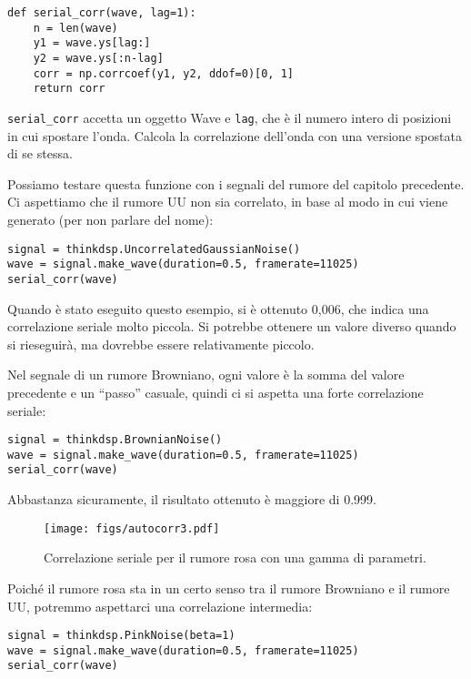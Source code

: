 \documentclass[12pt,a4paper]{book}
\begin{document}
\begin{verbatim} 
def serial_corr(wave, lag=1):
    n = len(wave)
    y1 = wave.ys[lag:]
    y2 = wave.ys[:n-lag]
    corr = np.corrcoef(y1, y2, ddof=0)[0, 1]
    return corr
 \end{verbatim} 

\verb"serial_corr" accetta un oggetto Wave e {\tt lag}, che è il numero intero di posizioni in cui spostare l'onda. Calcola la correlazione dell'onda con una versione spostata di se stessa.

Possiamo testare questa funzione con i segnali del rumore del capitolo precedente. Ci aspettiamo che il rumore UU non sia correlato, in base al modo in cui viene generato (per non parlare del nome):

\begin{verbatim} 
signal = thinkdsp.UncorrelatedGaussianNoise()
wave = signal.make_wave(duration=0.5, framerate=11025)
serial_corr(wave)
 \end{verbatim} 

Quando è stato eseguito questo esempio, si è ottenuto 0,006, che indica una correlazione seriale molto piccola. Si potrebbe ottenere un valore diverso quando si rieseguirà, ma dovrebbe essere relativamente piccolo.

Nel segnale di un rumore Browniano, ogni valore è la somma del valore precedente e un ``passo'' casuale, quindi ci si aspetta una forte correlazione seriale:

\begin{verbatim} 
signal = thinkdsp.BrownianNoise()
wave = signal.make_wave(duration=0.5, framerate=11025)
serial_corr(wave)
 \end{verbatim} 

Abbastanza sicuramente, il risultato ottenuto è maggiore di 0.999.

\begin{figure} 

\centerline{\texttt{[image: figs/autocorr3.pdf]}} \caption{Correlazione seriale per il rumore rosa con una gamma di parametri.} \label{fig.autocorr3} \end{figure} 

Poiché il rumore rosa sta in un certo senso tra il rumore Browniano e il rumore UU, potremmo aspettarci una correlazione intermedia:

\begin{verbatim} 
signal = thinkdsp.PinkNoise(beta=1)
wave = signal.make_wave(duration=0.5, framerate=11025)
serial_corr(wave)
 \end{verbatim} 
\end{document}
